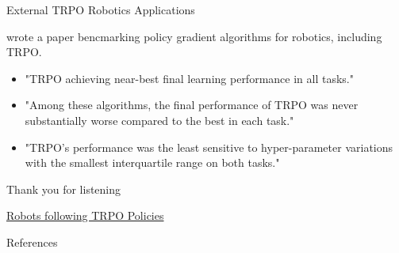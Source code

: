 \documentclass{beamer}
\begin{document}
\begin{frame}{External TRPO Robotics Applications}    

\cite{benchmark_robots} wrote a paper bencmarking policy gradient algorithms for robotics, including TRPO. 
\begin{itemize}
    \item "TRPO achieving near-best final learning performance in all tasks." 
    \item "Among these algorithms, the final performance of TRPO was never substantially worse compared to the best in each task."
    \item  "TRPO’s performance was the least sensitive to hyper-parameter variations with the smallest interquartile range on both tasks."
\end{itemize}

\end{frame}

\begin{frame}{Thank you for listening}

\href{https://www.youtube.com/watch?v=ovDfhvjpQd8&t=387s}{Robots following TRPO Policies}


\end{frame}


\begin{frame}{References}
    
    
\end{frame}
\end{document}

